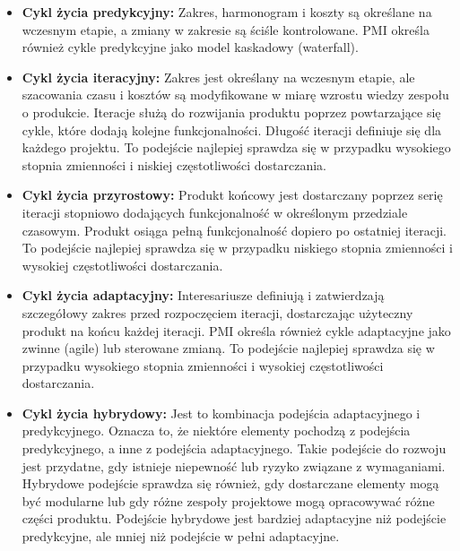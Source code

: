 \begin{itemize}
    \item \textbf{Cykl życia predykcyjny:} Zakres, harmonogram i koszty są określane na wczesnym etapie, a zmiany w zakresie są ściśle kontrolowane. PMI określa również cykle predykcyjne jako model kaskadowy (waterfall).\autocite{pmbok}\autocite{ITPM}
    
    \item \textbf{Cykl życia iteracyjny:} Zakres jest określany na wczesnym etapie, ale szacowania czasu i kosztów są modyfikowane w miarę wzrostu wiedzy zespołu o produkcie. Iteracje służą do rozwijania produktu poprzez powtarzające się cykle, które dodają kolejne funkcjonalności.\autocite{sommerville2015software}\autocite{farley2021}\autocite{pmbok6} Długość iteracji definiuje się dla każdego projektu.\autocite{swebok} To podejście najlepiej sprawdza się w przypadku wysokiego stopnia zmienności i niskiej częstotliwości dostarczania.\autocite{ITPM}
    
    \item \textbf{Cykl życia przyrostowy:} Produkt końcowy jest dostarczany poprzez serię iteracji stopniowo dodających funkcjonalność w określonym przedziale czasowym. Produkt osiąga pełną funkcjonalność dopiero po ostatniej iteracji.\autocite{sommerville2015software}\autocite{farley2021}\autocite{pmbok6} To podejście najlepiej sprawdza się w przypadku niskiego stopnia zmienności i wysokiej częstotliwości dostarczania.\autocite{ITPM}
    
    \item \textbf{Cykl życia adaptacyjny:} Interesariusze definiują i zatwierdzają szczegółowy zakres przed rozpoczęciem iteracji, dostarczając użyteczny produkt na końcu każdej iteracji. PMI określa również cykle adaptacyjne jako zwinne (agile) lub sterowane zmianą. To podejście najlepiej sprawdza się w przypadku wysokiego stopnia zmienności i wysokiej częstotliwości dostarczania.\autocite{pmbok6}\autocite{ITPM}
    
    \item \textbf{Cykl życia hybrydowy:} Jest to kombinacja podejścia adaptacyjnego i predykcyjnego. Oznacza to, że niektóre elementy pochodzą z podejścia predykcyjnego, a inne z podejścia adaptacyjnego. Takie podejście do rozwoju jest przydatne, gdy istnieje niepewność lub ryzyko związane z wymaganiami. Hybrydowe podejście sprawdza się również, gdy dostarczane elementy mogą być modularne lub gdy różne zespoły projektowe mogą opracowywać różne części produktu. Podejście hybrydowe jest bardziej adaptacyjne niż podejście predykcyjne, ale mniej niż podejście w pełni adaptacyjne.\autocite{pmbok7}
\end{itemize}

